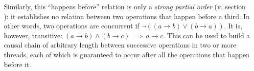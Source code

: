 Similarly, this ``happens before'' relation is only a \emph{strong partial
order} (v. section ): it establishes no relation
between two operations that happen before a third.  In other words, two
operations are concurrent if $\neg ((a \to b) \lor (b \to a))$.  It is, however,
transitive: $(a \to b) \land (b \to c) \, \implies \, a \to c$.  This can be
used to build a causal chain of arbitrary length between successive operations
in two or more threads, each of which is guaranteed to occur after all the
operations that happen before it.
